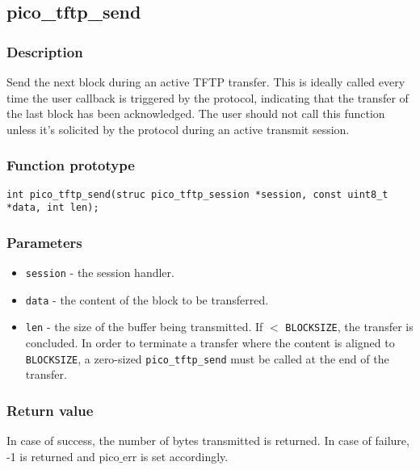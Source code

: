 
\subsection{pico\_tftp\_send}
\subsubsection*{Description}
Send the next block during an active TFTP transfer. This is ideally called every time the user callback is triggered by the protocol, indicating that the transfer of the last block has been acknowledged. The user should not call this function unless it's solicited by the protocol during an active transmit session.


\subsubsection*{Function prototype}
\begin{verbatim}
int pico_tftp_send(struc pico_tftp_session *session, const uint8_t *data, int len);
\end{verbatim}


\subsubsection*{Parameters}
\begin{itemize}[noitemsep]
\item \texttt{session} - the session handler.
\item \texttt{data} - the content of the block to be transferred.
\item \texttt{len} - the size of the buffer being transmitted. If $<$ \texttt{BLOCKSIZE}, the transfer is concluded. In order to terminate a transfer where the content is aligned to \texttt{BLOCKSIZE}, a zero-sized \texttt{pico\_tftp\_send} must be called at the end of the transfer.
\end{itemize}

\subsubsection*{Return value}
In case of success, the number of bytes transmitted is returned. In case of failure, -1 is returned and pico$\_$err is set accordingly.


